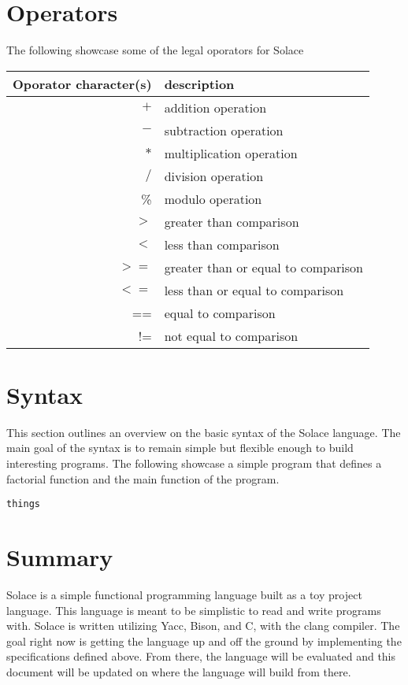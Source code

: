 \documentclass{article}
\begin{document}
\section{Operators}
The following showcase some of the legal oporators for Solace

\begin{tabular}{r|l}
Oporator character(s) & description \\
\hline
\hline
$+$ & addition operation \\
$-$ & subtraction operation \\
$*$ & multiplication operation \\
$/$ & division operation \\
\% & modulo operation \\
$>$ & greater than comparison \\
$<$ & less than comparison \\
$>=$ & greater than or equal to comparison \\
$<=$ & less than or equal to comparison \\
== & equal to comparison \\
!= & not equal to comparison \\
\hline
\end{tabular}


\section{Syntax}
This section outlines an overview on the basic syntax of the Solace language. The main goal of the syntax is to remain
simple but flexible enough to build interesting programs. The following showcase a simple program that defines a
factorial function and the main function of the program.

\begin{verbatim}
things

\end{verbatim}


\section{Summary}
Solace is a simple functional programming language built as a toy project language.
This language is meant to be simplistic to read and write programs with. Solace is written 
utilizing Yacc, Bison, and C, with the clang compiler.
The goal right now is getting the language up and off the ground by implementing the
specifications defined above. From there, the language will be evaluated and this document
will be updated on where the language will build from there.
\end{document}
